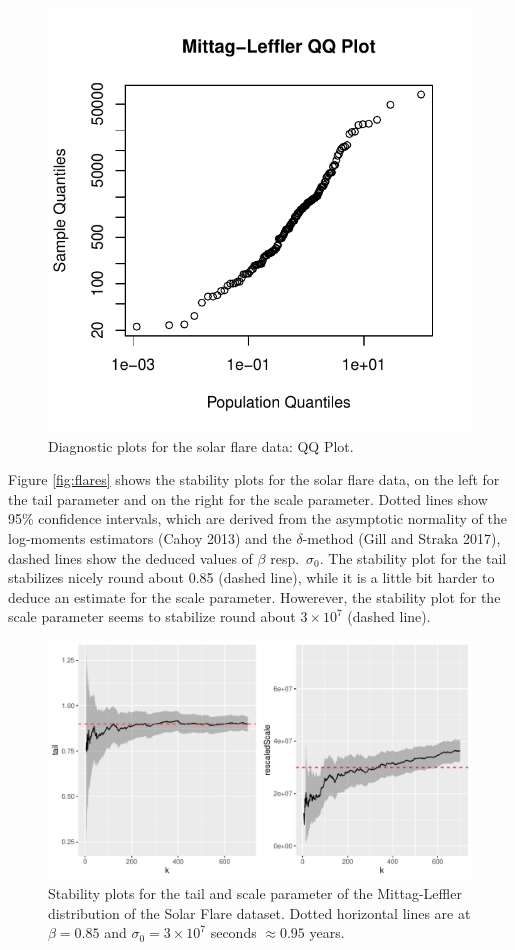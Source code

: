 \documentclass[]{elsarticle} %
\begin{document}
\begin{figure}

{\centering \includegraphics[width=0.7\linewidth]{article_springer_files/figure-latex/flare-diagnostics-3-1} 

}

\caption{\label{fig:flare-diagnostics-3} Diagnostic plots for the solar flare data: QQ Plot.}\label{fig:flare-diagnostics-3}
\end{figure}

Figure \ref{fig:flares} shows the stability plots for the solar flare
data, on the left for the tail parameter and on the right for the scale
parameter. Dotted lines show 95\% confidence intervals, which are
derived from the asymptotic normality of the log-moments estimators
(Cahoy 2013) and the \(\delta\)-method (Gill and Straka 2017), dashed
lines show the deduced values of \(\beta\) resp.~\(\sigma_0\). The
stability plot for the tail stabilizes nicely round about 0.85 (dashed
line), while it is a little bit harder to deduce an estimate for the
scale parameter. Howerever, the stability plot for the scale parameter
seems to stabilize round about \(3 \times 10^7\) (dashed line).

\begin{figure}
\includegraphics[width=\textwidth]{article_springer_files/figure-latex/solar-flare-tail-scale-1} \caption{\label{fig:flares} Stability plots for the tail and scale parameter of the Mittag-Leffler distribution of the Solar Flare dataset. Dotted horizontal lines are at $\beta = 0.85$ and $\sigma_0 = 3 \times 10^7$ seconds $\approx 0.95$ years.}\label{fig:solar-flare-tail-scale}
\end{figure}
\end{document}

